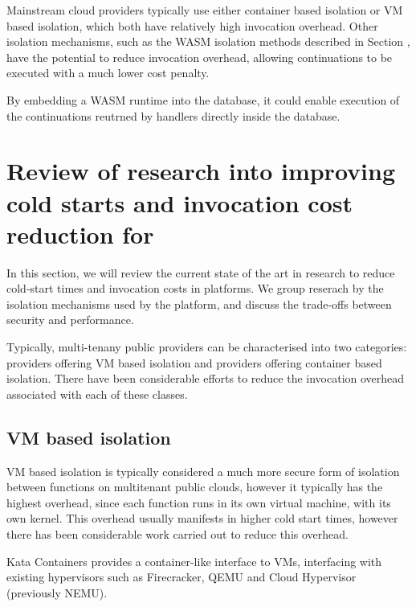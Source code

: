 Mainstream cloud providers typically use either container based isolation or VM based isolation, which both have relatively high invocation overhead. Other isolation mechanisms, such as the WASM isolation methods described in Section , have the potential to reduce invocation overhead, allowing continuations to be executed with a much lower cost penalty.

By embedding a WASM runtime into the database, it could enable execution of the continuations reutrned by \faaasc{} handlers directly inside the database.

\section{Review of research into improving cold starts and invocation cost reduction for \faas{}}
\label{sec:faas-isolation}
In this section, we will review the current state of the art in research to reduce cold-start times and invocation costs in \faas{} platforms. We group reserach by the isolation mechanisms used by the \faas{} platform, and discuss the trade-offs between security and performance.

Typically, multi-tenany public \faas{} providers can be characterised into two categories: providers offering VM based isolation\cite{agacheFirecrackerLightweightVirtualization2020} and providers offering container based isolation\cite{GVisor}. There have been considerable efforts to reduce the invocation overhead associated with each of these classes.

\subsection{VM based isolation}
VM based isolation is typically considered a much more secure form of isolation between \faas{} functions on multitenant public clouds\cite{jithinVirtualMachineIsolation2014}, however it typically has the highest overhead, since each function runs in its own virtual machine, with its own kernel. This overhead usually manifests in higher cold start times, however there has been considerable work carried out to reduce this overhead\cite{razaviPrebakedUVMsScalable2015,agacheFirecrackerLightweightVirtualization2020,dawXanaduMitigatingCascading2020,oliverstenbomRefunctionEliminatingServerless2019}.

Kata Containers\cite{KataContainersOpen} provides a container-like interface to VMs, interfacing with existing hypervisors such as Firecracker\cite{agacheFirecrackerLightweightVirtualization2020}, QEMU\cite{QEMU} and Cloud Hypervisor\cite{CloudhypervisorCloudhypervisorVirtual} (previously NEMU\cite{IntelNemu2024}).

